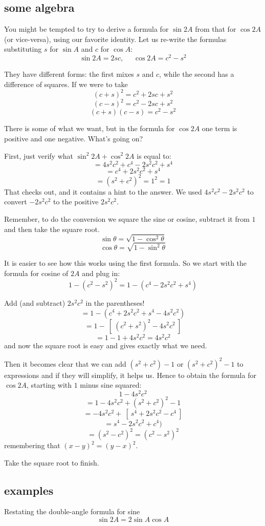 \documentclass[11pt, oneside]{article}
\begin{document}
\subsection*{some algebra}

You might be tempted to try to derive a formula for $\sin 2A$ from that for $\cos 2A$ (or vice-versa), using our favorite identity.  Let us re-write the formulas substituting $s$ for $\sin A$ and $c$ for $\cos A$:
\[ \sin 2A = 2sc, \ \ \ \ \ \  \cos 2A = c^2 - s^2 \]

They have different forms:  the first mixes $s$ and $c$, while the second has a difference of squares.  If we were to take
\[ (c + s)^2 = c^2 + 2sc + s^2 \]
\[ (c - s)^2 = c^2 - 2sc + s^2 \]
\[ (c + s)(c - s) = c^2 - s^2 \]

There is some of what we want, but in the formula for $\cos 2A$ one term is positive and one negative.  What's going on?

First, just verify what $\sin^2 2A + \cos^2 2A$ is equal to:
\[ = 4s^2c^2 + c^4 - 2s^2c^2 + s^4 \]
\[ = c^4 + 2s^2c^2 + s^4 \]
\[ = (s^2 + c^2)^2 = 1^2 = 1 \]
That checks out, and it contains a hint to the answer.  We used $4s^2c^2 - 2s^2c^2$ to convert $-2s^2c^2$ to the positive $2s^2c^2$.

Remember, to do the conversion we square the sine or cosine, subtract it from $1$ and then take the square root.  \[ \sin \theta = \sqrt{1 - \cos^2 \theta} \]
\[ \cos \theta = \sqrt{1 - \sin^2 \theta} \]

It is easier to see how this works using the first formula.  So we start with the formula for cosine of $2A$ and plug in:
\[ 1 - (c^2 - s^2)^2 = 1 - (c^4 - 2s^2c^2 + s^4) \]

Add (and subtract) $2s^2c^2$ in the parentheses!
\[ = 1 - (c^4 + 2s^2c^2 + s^4 - 4s^2c^2) \]
\[ = 1 - \ [ \ (c^2 + s^2)^2 - 4s^2c^2 \ ]  \]
\[ = 1 - 1 + 4s^2c^2 = 4s^2c^2 \]
and now the square root is easy and gives exactly what we need.

Then it becomes clear that we can add $(s^2 + c^2) - 1$ or $(s^2+c^2)^2 - 1$ to expressions and if they will simplify, it helps us.  Hence to obtain the formula for $\cos 2A$, starting with $1$ minus sine squared:
\[ 1 - 4s^2c^2 \]
\[ = 1 - 4s^2c^2 + (s^2 + c^2)^2 - 1 \]
\[ = - 4s^2c^2 + \ [ \ s^4 + 2s^2 c^2 - c^4 \ ]   \]
\[ = s^4 - 2s^2c^2 + c^4) \]
\[ = (s^2 - c^2)^2 = (c^2 - s^2)^2 \]
remembering that $(x - y)^2 = (y - x)^2$.

Take the square root to finish.

\subsection*{examples}
Restating the double-angle formula for sine
\[ \sin 2A = 2 \sin A \cos A \]
\end{document}
